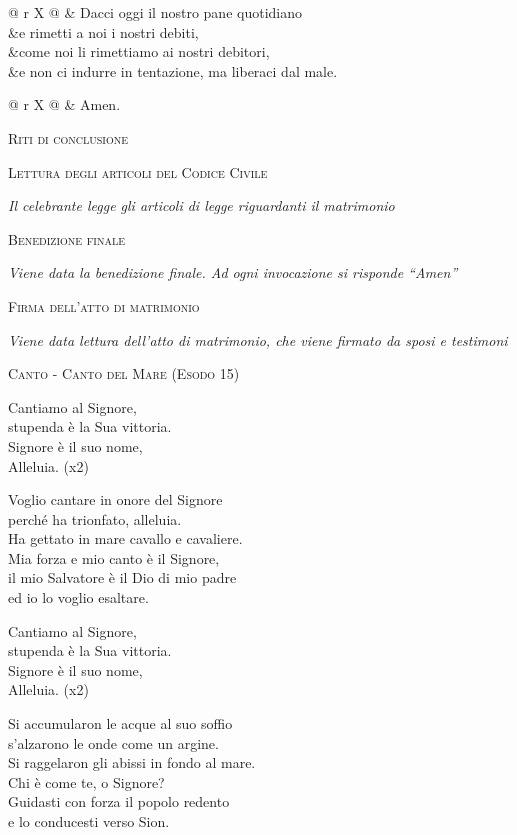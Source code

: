 \documentclass[12pt,twoside]{article}
\makeatletter
\newcommand{\htwo}[1]{{\Large\scshape #1}}
\newcommand{\masspart}[1]{\bigskip

  \htwo{#1}}
\newcommand{\masssubpart}[1]{\bigskip

  {\large\scshape #1}}
\newcommand{\note}[1]{{\centering \textit{#1}}}
\newcommand{\sayline}[2]{
  \begin{tabularx}{\textwidth}{@{} r X @{}}
    \makebox[6.0em][r]{\ifx&#1& #1 \else \textit{#1:} \fi} & #2
\end{tabularx}}
\makeatother
\begin{document}
\sayline{}{Dacci oggi il nostro pane quotidiano\\
&e rimetti a noi i nostri debiti,\\
&come noi li rimettiamo ai nostri debitori,\\
&e non ci indurre in tentazione, ma liberaci dal male.}

\sayline{}{Amen.}

\masspart{Riti di conclusione}

\masssubpart{Lettura degli articoli del Codice Civile}

\note{Il celebrante legge gli articoli di legge riguardanti il matrimonio}

\masssubpart{Benedizione finale}

\note{Viene data la benedizione finale. Ad ogni invocazione si risponde ``Amen''}

\masssubpart{Firma dell'atto di matrimonio}

\note{Viene data lettura dell'atto di matrimonio, che viene firmato da sposi e testimoni}

\newpage

\masssubpart{Canto - Canto del Mare (Esodo 15)}

Cantiamo al Signore,\\
stupenda è la Sua vittoria.\\
Signore è il suo nome,\\
Alleluia. (x2)

Voglio cantare in onore del Signore\\
perché ha trionfato, alleluia.\\
Ha gettato in mare cavallo e cavaliere.\\
Mia forza e mio canto è il Signore,\\
il mio Salvatore è il Dio di mio padre\\
ed io lo voglio esaltare.

Cantiamo al Signore,\\
stupenda è la Sua vittoria.\\
Signore è il suo nome,\\
Alleluia. (x2)

Si accumularon le acque al suo soffio\\
s'alzarono le onde come un argine.\\
Si raggelaron gli abissi in fondo al mare.\\
Chi è come te, o Signore?\\
Guidasti con forza il popolo redento\\
e lo conducesti verso Sion.


\newpage
\null

\newpage
\null
\end{document}
